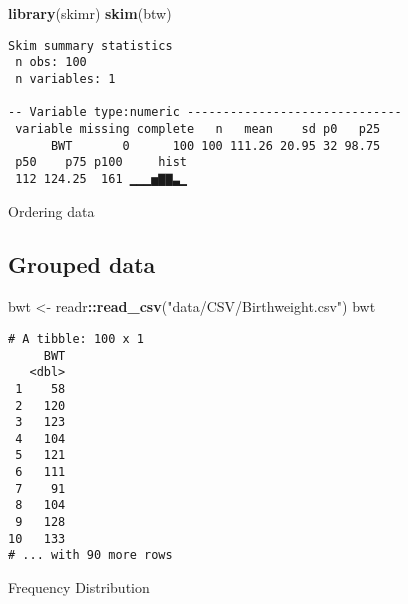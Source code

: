 \documentclass[12pt,]{article}
\newenvironment{Shaded}{\begin{snugshade}}{\end{snugshade}}
\newcommand{\CommentTok}[1]{\textcolor[rgb]{0.56,0.35,0.01}{\textit{#1}}}
\newcommand{\DataTypeTok}[1]{\textcolor[rgb]{0.13,0.29,0.53}{#1}}
\newcommand{\KeywordTok}[1]{\textcolor[rgb]{0.13,0.29,0.53}{\textbf{#1}}}
\newcommand{\NormalTok}[1]{#1}
\newcommand{\OperatorTok}[1]{\textcolor[rgb]{0.81,0.36,0.00}{\textbf{#1}}}
\newcommand{\StringTok}[1]{\textcolor[rgb]{0.31,0.60,0.02}{#1}}
\begin{document}
\begin{Shaded}
\begin{Highlighting}[]
\KeywordTok{library}\NormalTok{(skimr)}
\KeywordTok{skim}\NormalTok{(btw)}
\end{Highlighting}
\end{Shaded}

\begin{verbatim}
Skim summary statistics
 n obs: 100 
 n variables: 1 

-- Variable type:numeric ------------------------------
 variable missing complete   n   mean    sd p0   p25
      BWT       0      100 100 111.26 20.95 32 98.75
 p50    p75 p100     hist
 112 124.25  161 ▁▁▁▅▇▇▃▁
\end{verbatim}

Ordering data

\hypertarget{grouped-data}{%
\subsection{Grouped data}\label{grouped-data}}

\begin{Shaded}
\begin{Highlighting}[]
\NormalTok{bwt <-}\StringTok{ }\NormalTok{readr}\OperatorTok{::}\KeywordTok{read_csv}\NormalTok{(}\StringTok{"data/CSV/Birthweight.csv"}\NormalTok{)}
\NormalTok{bwt}
\end{Highlighting}
\end{Shaded}

\begin{verbatim}
# A tibble: 100 x 1
     BWT
   <dbl>
 1    58
 2   120
 3   123
 4   104
 5   121
 6   111
 7    91
 8   104
 9   128
10   133
# ... with 90 more rows
\end{verbatim}

Frequency Distribution

\begin{Shaded}
\end{Shaded}
\end{document}
